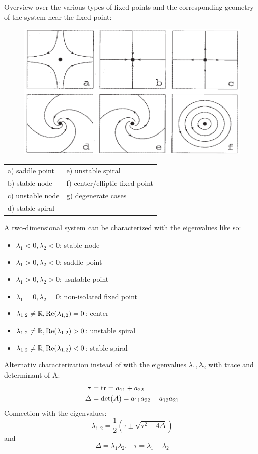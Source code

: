 Overview over the various types of fixed points and the corresponding geometry of the system near the fixed point:
\begin{figure}[H]
  \centering
  \includegraphics[width=.7\linewidth]{Pics/4.18.png}
\end{figure}

\begin{table}[H]
  \footnotesize
  \begin{tabular}{ll}
    a) saddle point    & e) unstable spiral\\
    b) stable node     & f) center/elliptic fixed point\\
    c) unstable node   & g) degenerate cases\\
    d) stable spiral   &
  \end{tabular}
\end{table}

A two-dimensional system can be characterized with the eigenvalues like so:
\begin{itemize}
  \item $\lambda_1 < 0, \lambda_2 < 0$: stable node
  \item $\lambda_1 > 0, \lambda_2 < 0$: saddle point
  \item $\lambda_1 > 0, \lambda_2 > 0$: usntable point
  \item $\lambda_1 = 0, \lambda_2 = 0$: non-isolated fixed point
  \item $\lambda_{1.2} \neq \mathbb{R}, \textup{Re}(\lambda_{1,2}) = 0$: center
  \item $\lambda_{1.2} \neq \mathbb{R}, \textup{Re}(\lambda_{1,2}) > 0$: unstable spiral
  \item $\lambda_{1.2} \neq \mathbb{R}, \textup{Re}(\lambda_{1,2}) < 0$: stable spiral
\end{itemize}

Alternativ characterization instead of with the eigenvalues $\lambda_1, \lambda_2$ with trace and determinant of A:
\begin{equation}
  \begin{split}
    \tau &= \textup{tr} = a_{11} + a_{22}\\
    \Delta &= \textup{det}(A) = a_{11}a_{22} - a_{12}a_{21}
  \end{split}
\end{equation}
Connection with the eigenvalues:
\begin{equation}
  \lambda_{1,2} = \frac{1}{2}\left(\tau \pm \sqrt{\tau^2 - 4\Delta}\right)
\end{equation}
and
\begin{equation}
  \Delta = \lambda_1 \lambda_2, \;\;\; \tau = \lambda_1 + \lambda_2
\end{equation}

